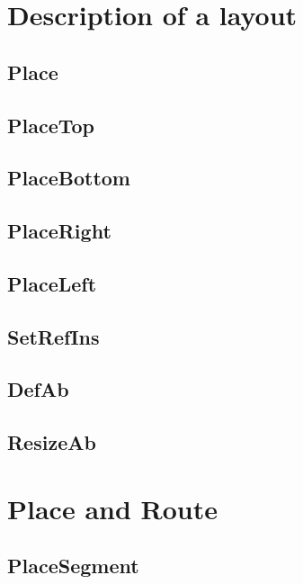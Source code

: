 \documentclass[11pt]{article}
\begin{document}
\section{Description of a layout}
\label{seclayout}

    \subsection{Place}
    \label{secplace}
    
    \subsection{PlaceTop}
    \label{sectop}
    
    \subsection{PlaceBottom}
    \label{secbottom}
    
    \subsection{PlaceRight}
    \label{secright}
    
    \subsection{PlaceLeft}
    \label{secleft}
    
    \subsection{SetRefIns}
    \label{secsetrefins}
    
    \subsection{DefAb}
    \label{secdefab}
    
    \subsection{ResizeAb}
    \label{secresizeab}
    
    
\section{Place and Route}
\label{secroute}

    \subsection{PlaceSegment}
    \label{secsegment}
    
\end{document}
